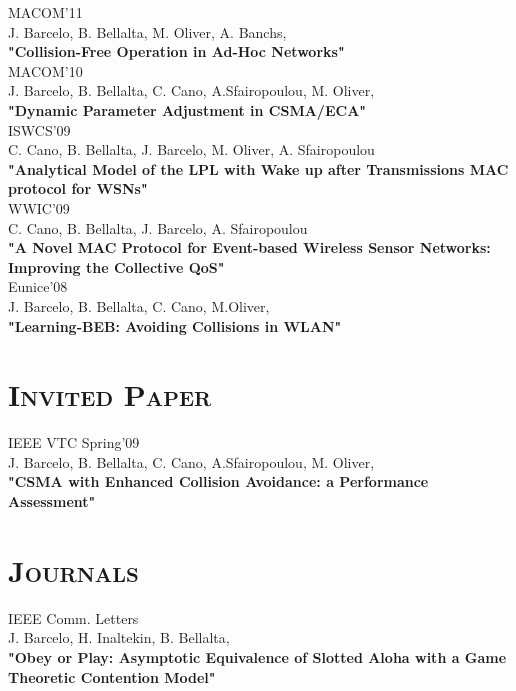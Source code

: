 \documentclass[line,margin]{res}
\begin{document}
\begin{resume}
\hfill {MACOM'11} \\
J. Barcelo, B. Bellalta,  M. Oliver, A. Banchs, \\
\textbf{"Collision-Free Operation in Ad-Hoc Networks"}\\

\hfill {MACOM'10} \\
J. Barcelo, B. Bellalta,  C. Cano, A.Sfairopoulou, M. Oliver,\\
\textbf{"Dynamic Parameter Adjustment in CSMA/ECA"}\\

\hfill {ISWCS'09} \\
C. Cano, B. Bellalta, J. Barcelo, M. Oliver, A. Sfairopoulou\\
\textbf{"Analytical Model of the LPL with Wake up after Transmissions MAC protocol for WSNs"}\\

\hfill {WWIC'09} \\
C. Cano, B. Bellalta, J. Barcelo, A. Sfairopoulou\\
\textbf{"A Novel MAC Protocol for Event-based Wireless Sensor Networks: Improving the Collective QoS"}\\

\hfill {Eunice'08 } \\
J. Barcelo, B. Bellalta,  C. Cano, M.Oliver,\\
\textbf{"Learning-BEB: Avoiding Collisions in WLAN"}\\

\section{\textsc{Invited Paper}}

\hfill {IEEE VTC Spring'09} \\
J. Barcelo, B. Bellalta,  C. Cano, A.Sfairopoulou, M. Oliver,\\
\textbf{"CSMA with Enhanced Collision Avoidance: a Performance Assessment"}\\

\section{\textsc{Journals}}

\hfill {IEEE Comm. Letters} \\
J. Barcelo, H. Inaltekin, B. Bellalta,\\
\textbf{"Obey or Play: Asymptotic Equivalence of Slotted Aloha with a Game Theoretic Contention Model"}\\


\end{resume}
\end{document}
